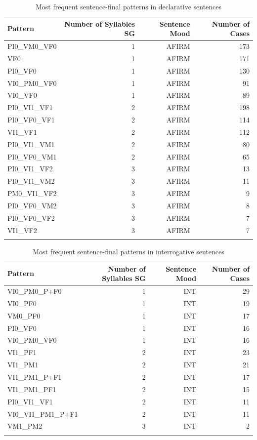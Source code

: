 \documentclass[output=paper]{langsci/langscibook}
\begin{document}
\vfill
\begin{table}
\begin{tabular}{lrrr}
\lsptoprule
Pattern & Number of Syllables SG & Sentence Mood & Number of Cases \\
\midrule
PI0\_VM0\_VF0 & 1 & AFIRM & 173 \\
VF0 & 1 & AFIRM & 171 \\
PI0\_VF0 & 1 & AFIRM & 130 \\
VI0\_PM0\_VF0 & 1 & AFIRM & 91 \\
VI0\_VF0 & 1 & AFIRM & 89 \\
PI0\_VI1\_VF1 & 2 & AFIRM & 198 \\
PI0\_VF0\_VF1 & 2 & AFIRM & 114 \\
VI1\_VF1 & 2 & AFIRM & 112 \\
PI0\_VI1\_VM1 & 2 & AFIRM & 80 \\
PI0\_VF0\_VM1 & 2 & AFIRM & 65 \\
PI0\_VI1\_VF2 & 3 & AFIRM & 13 \\
PI0\_VI1\_VM2 & 3 & AFIRM & 11 \\
PM0\_VI1\_VF2 & 3 & AFIRM & 9 \\
PI0\_VF0\_VM2 & 3 & AFIRM & 8 \\
PI0\_VF0\_VF2 & 3 & AFIRM & 7 \\
VI1\_VF2 & 3 & AFIRM & 7 \\
\lspbottomrule
\end{tabular}
\caption{Most frequent sentence-final patterns in declarative sentences \citep{Garrido2012enton}}
\label{tab:gar:7}
\end{table}
\vfill

\begin{table}
\begin{tabular}{lrrr}
\lsptoprule
Pattern & Number of Syllables SG & Sentence Mood & Number of Cases \\
\midrule
VI0\_PM0\_P+F0 & 1 & INT & 29 \\
VI0\_PF0 & 1 & INT & 19 \\
VM0\_PF0 & 1 & INT & 17 \\
PI0\_VF0 & 1 & INT & 16 \\
VI0\_PM0\_VF0 & 1 & INT & 16 \\
VI1\_PF1 & 2 & INT & 23 \\
VI1\_PM1 & 2 & INT & 21 \\
VI1\_PM1\_P+F1 & 2 & INT & 17 \\
VI1\_PM1\_PF1 & 2 & INT & 15 \\
PI0\_VI1\_VF1 & 2 & INT & 11 \\
VI0\_VI1\_PM1\_P+F1 & 2 & INT & 11 \\
VM1\_PM2 & 3 & INT & 2 \\
\lspbottomrule
\end{tabular}

\caption{Most frequent sentence-final patterns in interrogative sentences \citep{Garrido2012enton}}
\label{tab:gar:8}
\end{table}
\end{document}
